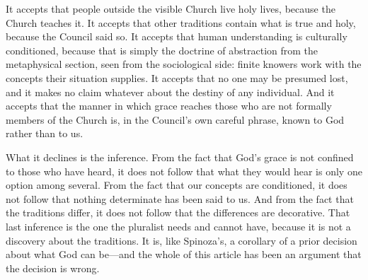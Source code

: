 It accepts that people outside the visible Church live holy lives, because the Church teaches it. It accepts that other traditions contain what is true and holy, because the Council said so. It accepts that human understanding is culturally conditioned, because that is simply the doctrine of abstraction from the metaphysical section, seen from the sociological side: finite knowers work with the concepts their situation supplies. It accepts that no one may be presumed lost, and it makes no claim whatever about the destiny of any individual. And it accepts that the manner in which grace reaches those who are not formally members of the Church is, in the Council's own careful phrase, known to God rather than to us.

What it declines is the inference. From the fact that God's grace is not confined to those who have heard, it does not follow that what they would hear is only one option among several. From the fact that our concepts are conditioned, it does not follow that nothing determinate has been said to us. And from the fact that the traditions differ, it does not follow that the differences are decorative. That last inference is the one the pluralist needs and cannot have, because it is not a discovery about the traditions. It is, like Spinoza's, a corollary of a prior decision about what God can be---and the whole of this article has been an argument that the decision is wrong.
